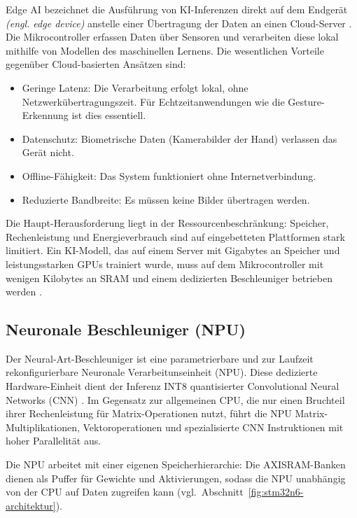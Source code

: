 Edge AI bezeichnet die Ausführung von KI-Inferenzen direkt auf dem Endgerät \textit{(engl. edge device)} anstelle einer Übertragung der Daten an einen Cloud-Server \cite{smalleyWhatEdgeAI2023, abadadeComprehensiveSurveyTinyML2023}. Die Mikrocontroller erfassen Daten über Sensoren und verarbeiten diese lokal mithilfe von Modellen des maschinellen Lernens. Die wesentlichen Vorteile gegenüber Cloud-basierten Ansätzen sind:

\begin{itemize}
    \item Geringe Latenz: Die Verarbeitung erfolgt lokal, ohne Netzwerkübertragungszeit. Für Echtzeitanwendungen wie die Gesture-Erkennung ist dies essentiell.
    \item Datenschutz: Biometrische Daten (Kamerabilder der Hand) verlassen das Gerät nicht.
    \item Offline-Fähigkeit: Das System funktioniert ohne Internetverbindung.
    \item Reduzierte Bandbreite: Es müssen keine Bilder übertragen werden.
\end{itemize}

Die Haupt-Herausforderung liegt in der Ressourcenbeschränkung: Speicher, Rechenleistung und Energieverbrauch sind auf eingebetteten Plattformen stark limitiert. Ein KI-Modell, das auf einem Server mit Gigabytes an Speicher und leistungsstarken GPUs trainiert wurde, muss auf dem Mikrocontroller mit wenigen Kilobytes an SRAM und einem dedizierten Beschleuniger betrieben werden \cite{abadadeComprehensiveSurveyTinyML2023}.

\subsection{Neuronale Beschleuniger (NPU)}\label{sub:npu}

Der Neural-Art-Beschleuniger ist eine parametrierbare und zur Laufzeit rekonfigurierbare Neuronale Verarbeitunseinheit (NPU). Diese dedizierte Hardware-Einheit dient der Inferenz INT8 quantisierter Convolutional Neural Networks (CNN) \cite[S. 1011 ff.]{rm0486}. Im Gegensatz zur allgemeinen CPU, die nur einen Bruchteil ihrer Rechenleistung für Matrix-Operationen nutzt, führt die NPU Matrix-Multiplikationen, Vektoroperationen und spezialisierte CNN Instruktionen mit hoher Parallelität aus.

Die NPU arbeitet mit einer eigenen Speicherhierarchie: Die AXISRAM-Banken dienen als Puffer für Gewichte und Aktivierungen, sodass die NPU unabhängig von der CPU auf Daten zugreifen kann (vgl.\ Abschnitt~\ref{fig:stm32n6-architektur}).

